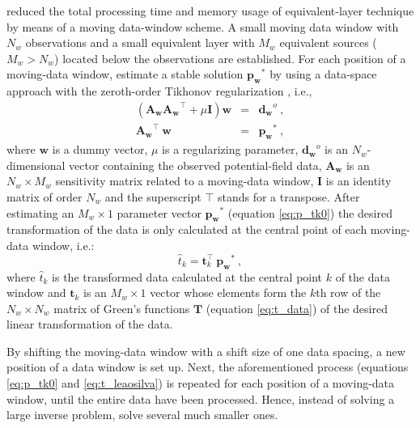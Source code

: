 \cite{leao-silva1989} reduced the total processing time and memory usage
of equivalent-layer technique by means of a moving data-window scheme.
A small moving data window with $N_w$ observations and a small equivalent layer with $M_w$ equivalent sources 
($M_w > N_w$) located  below the observations are established.
For each position of a moving-data window, \cite{leao-silva1989} estimate a stable solution 
$\mathbf{{p_w}^{\ast}}$ by using a data-space approach with the zeroth-order Tikhonov regularization 
\citep{aster2018parameter}, i.e.,
\begin{subequations}
\begin{eqnarray}
\left( \mathbf{A_w} \mathbf{A_w}^{\top} + \mu \mathbf{I}\right) \mathbf{w} &=& \mathbf{d_w}^{o} \:, \\
\mathbf{A_w}^{\top} \: \mathbf{w} &=&  \mathbf{{p_w}^{\ast}} \:, 
\label{eq:p_tk0}
\end{eqnarray}
\end{subequations}
where $\mathbf{w}$ is a dummy vector, 
$\mu$ is a regularizing parameter, 
$\mathbf{d_w}^{o}$ is an $N_w$-dimensional vector containing the observed potential-field data, 
$\mathbf{A_w}$ is an $N_w \times M_w$  sensitivity matrix related to a moving-data window, 
$\mathbf{I}$ is  an identity matrix of order $N_w$ and 
the superscript $\top$ stands for a transpose. 
After estimating an $M_w \times 1$ parameter vector $\mathbf{{p_w}^{\ast}}$  (equation \ref{eq:p_tk0}) 
the desired transformation of the data is only calculated at the central point of each moving-data window, i.e.:
\begin{equation}
	\hat{t}_{k} = \mathbf{t}_k^{\top} \: \mathbf{{p_w}^{\ast}} \: ,
	\label{eq:t_leaosilva}
\end{equation}
where $\hat{t}_{k}$ is the transformed data calculated at the central point ${k}$ of the data window and
$\mathbf{t}_k$ is an $M_w \times 1$ vector whose elements form the $k$th row of the $N_w \times N_w$ 
matrix of Green's functions $\mathbf{T}$ (equation \ref{eq:t_data}) of 
the desired linear transformation of the data.

By shifting the moving-data window with a shift size of one data spacing, 
a new position of a data window is set up.
Next, the aforementioned process (equations \ref{eq:p_tk0} and \ref{eq:t_leaosilva}) is repeated  for each position of a moving-data window, until the entire data have been processed.
Hence, instead of solving a large inverse problem, \cite{leao-silva1989} solve several much smaller ones. 


